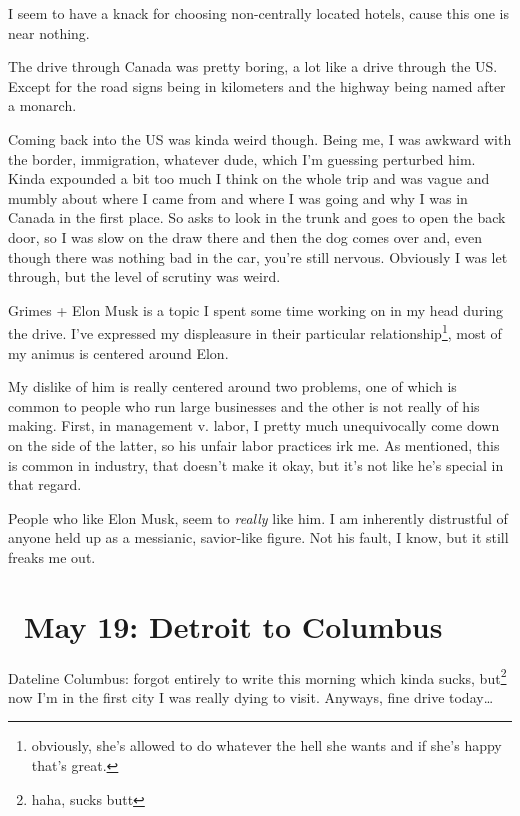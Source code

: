 \documentclass[../butidigress.tex]{subfiles}
\begin{document}
 I seem to have a knack for choosing non-centrally located hotels, cause this one is near nothing.

The drive through Canada was pretty boring, a lot like a drive through the US.
Except for the road signs being in kilometers and the highway being named after a monarch.

Coming back into the US was kinda weird though.
Being me, I was awkward with the border, immigration, whatever dude, which I'm guessing perturbed him.
Kinda expounded a bit too much I think on the whole trip and was vague and mumbly about where I came from and where I was going and why I was in Canada in the first place.
So asks to look in the trunk and goes to open the back door, so I was slow on the draw there and then the dog comes over and, even though there was nothing bad in the car, you're still nervous.
Obviously I was let through, but the level of scrutiny was weird.

Grimes + Elon Musk is a topic I spent some time working on in my head during the drive.
I've expressed my displeasure in their particular relationship\footnote{obviously, she's allowed to do whatever the hell she wants and if she's happy that's great.}, most of my animus is centered around Elon.

My dislike of him is really centered around two problems, one of which is common to people who run large businesses and the other is not really of his making.
First, in management v. labor, I pretty much unequivocally come down on the side of the latter, so his unfair labor practices irk me.
As mentioned, this is common in industry, that doesn't make it okay, but it's not like he's special in that regard.

People who like Elon Musk, seem to \emph{really} like him.
I am inherently distrustful of anyone held up as a messianic, savior-like figure.
Not his fault, I know, but it still freaks me out.

\section{\ May 19: Detroit to Columbus}
Dateline Columbus: forgot entirely to write this morning which kinda sucks, but\footnote{haha, sucks butt} now I'm in the first city I was really dying to visit.
Anyways, fine drive today\ldots
\end{document}
